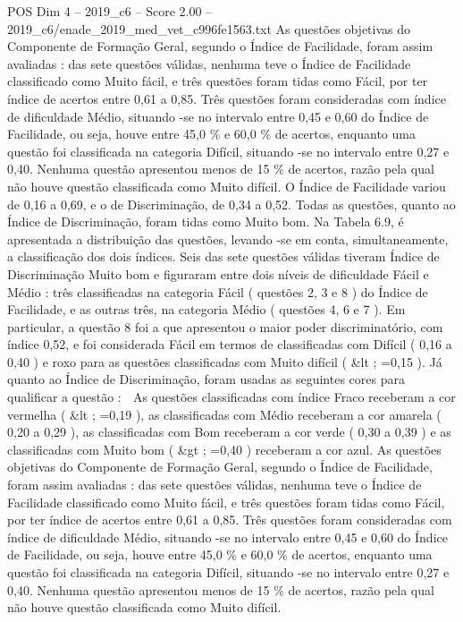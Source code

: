 \begin{textsample}{POS Dim 4 – 2019\_c6 – Score 2.00 – 2019\_c6/enade\_2019\_med\_vet\_c996fe1563.txt}
As questões objetivas do Componente de Formação Geral, segundo o Índice de Facilidade, foram assim avaliadas : das sete questões válidas, nenhuma teve o Índice de Facilidade classificado como Muito fácil, e três questões foram tidas como Fácil, por ter índice de acertos entre 0,61 a 0,85.
Três questões foram consideradas com índice de dificuldade Médio, situando -se no intervalo entre 0,45 e 0,60 do Índice de Facilidade, ou seja, houve entre 45,0 \% e 60,0 \% de acertos, enquanto uma questão foi classificada na categoria Difícil, situando -se no intervalo entre 0,27 e 0,40.
Nenhuma questão apresentou menos de 15 \% de acertos, razão pela qual não houve questão classificada como Muito difícil.
O Índice de Facilidade variou de 0,16 a 0,69, e o de Discriminação, de 0,34 a 0,52.
Todas as questões, quanto ao Índice de Discriminação, foram tidas como Muito bom.
Na Tabela 6.9, é apresentada a distribuição das questões, levando -se em conta, simultaneamente, a classificação dos dois índices.
Seis das sete questões válidas tiveram Índice de Discriminação Muito bom e figuraram entre dois níveis de dificuldade Fácil e Médio : três classificadas na categoria Fácil ( questões 2, 3 e 8 ) do Índice de Facilidade, e as outras três, na categoria Médio ( questões 4, 6 e 7 ).
Em particular, a questão 8 foi a que apresentou o maior poder discriminatório, com índice 0,52, e foi considerada Fácil em termos de classificadas com Difícil ( 0,16 a 0,40 ) e roxo para as questões classificadas com Muito difícil ( \&lt ; =0,15 ).
Já quanto ao Índice de Discriminação, foram usadas as seguintes cores para qualificar a questão :  As questões classificadas com índice Fraco receberam a cor vermelha ( \&lt ; =0,19 ), as classificadas com Médio receberam a cor amarela ( 0,20 a 0,29 ), as classificadas com Bom receberam a cor verde ( 0,30 a 0,39 ) e as classificadas com Muito bom ( \&gt ; =0,40 ) receberam a cor azul.
As questões objetivas do Componente de Formação Geral, segundo o Índice de Facilidade, foram assim avaliadas : das sete questões válidas, nenhuma teve o Índice de Facilidade classificado como Muito fácil, e três questões foram tidas como Fácil, por ter índice de acertos entre 0,61 a 0,85.
Três questões foram consideradas com índice de dificuldade Médio, situando -se no intervalo entre 0,45 e 0,60 do Índice de Facilidade, ou seja, houve entre 45,0 \% e 60,0 \% de acertos, enquanto uma questão foi classificada na categoria Difícil, situando -se no intervalo entre 0,27 e 0,40.
Nenhuma questão apresentou menos de 15 \% de acertos, razão pela qual não houve questão classificada como Muito difícil.

\end{textsample}

